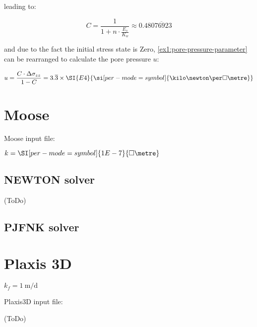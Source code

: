 \vspace{1em}

leading to:

\begin{equation}
    C = \frac{1}{1 + n \cdot \frac{E_s}{K_w}} \approx 0.48\overline{076923}
\end{equation}

and due to the fact the initial stress state is Zero,
\autoref{ex1:pore-pressure-parameter} can be rearranged to calculate the pore
pressure $u$:

\begin{equation}
    u = \frac{C \cdot \Delta \sigma_{zz}}{1 - C} = 3.\overline{3}\times\SI{E4}{\si[per-mode = symbol]{\kilo\newton\per\square\metre}}
\end{equation}


\section{Moose}

Moose input file: 

$k = \SI[per-mode = symbol]{1E-7}{\square\metre}$

\subsection{NEWTON solver}

(ToDo)

\subsection{PJFNK solver}

\section{Plaxis 3D}

$k_f = \SI[per-mode = symbol]{1}{\metre\per\day}$

Plaxis3D input file: 

(ToDo)